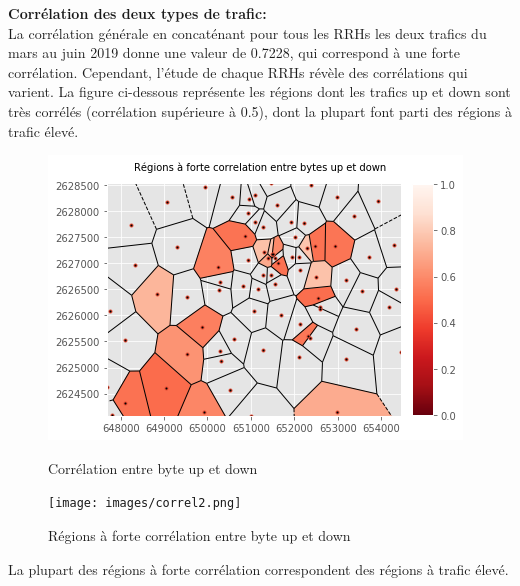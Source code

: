 \documentclass{report}
\begin{document}
\textbf{Corrélation des deux types de trafic: }\\
La corrélation générale en concaténant pour tous les RRHs les deux trafics du mars au juin 2019 donne une valeur de 0.7228, qui correspond à une forte corrélation. Cependant, l'étude de chaque RRHs révèle des corrélations qui varient. La figure ci-dessous représente les régions dont les trafics up et down sont très corrélés (corrélation supérieure à 0.5), dont la plupart font parti des régions à trafic élevé.
\begin{figure}[H]
   \begin{minipage}{0.4\textwidth}
     \centering
     \includegraphics[scale=0.55]{images/correl.png}
     \caption{Corrélation entre byte up et down }\label{Fig:Data1}
   \end{minipage}\hfill
   \begin{minipage}{0.4\textwidth}
     \centering
     \texttt{[image: images/correl2.png]}
     \caption{Régions à forte corrélation entre byte up et down  }\label{Fig:Data2}
   \end{minipage}
\end{figure} 

La plupart des régions à forte corrélation correspondent des régions à trafic élevé.\\
\end{document}
